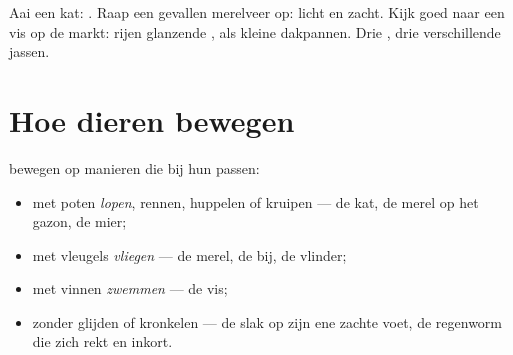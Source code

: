 \begin{example}\label{ex:g1:animals-around-us:covering}
Aai een kat: . Raap een gevallen merelveer op: licht en zacht.
Kijk goed naar een vis op de markt: rijen glanzende , als
kleine dakpannen. Drie , drie verschillende jassen.
\end{example}

\section{Hoe dieren bewegen}

\begin{proposition}\label{prop:g1:animals-around-us:moving}
 bewegen op manieren die bij hun  passen:
\begin{itemize}
  \item {} met poten \emph{lopen}, rennen, huppelen of kruipen ---
        de kat, de merel op het gazon, de mier;
  \item {} met vleugels \emph{vliegen} --- de merel,
        de bij, de vlinder;
  \item {} met vinnen \emph{zwemmen} --- de vis;
  \item {} zonder  glijden of kronkelen --- de slak op
        zijn ene zachte voet, de regenworm die zich rekt en inkort.
\end{itemize}
\end{proposition}
\admitted

